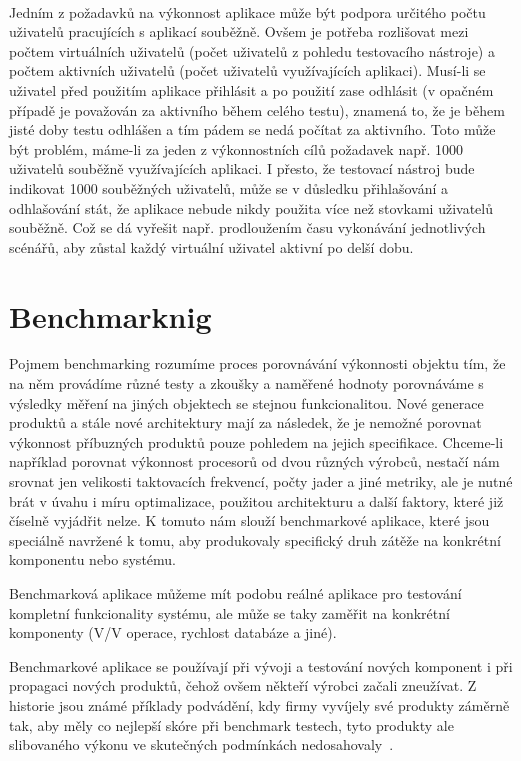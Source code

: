 \documentclass[122pt,oneside]{fithesis}
\begin{document}
\vspace{5 mm}
\\\indent Jedním z požadavků na výkonnost aplikace může být podpora určitého počtu uživatelů pracujících s aplikací souběžně. Ovšem je potřeba rozlišovat mezi počtem virtuálních uživatelů (počet uživatelů z pohledu testovacího nástroje) a počtem aktivních uživatelů (počet uživatelů využívajících aplikaci). Musí-li se uživatel před použitím aplikace přihlásit a po použití zase odhlásit (v opačném případě je považován za aktivního během celého testu), znamená to, že je během jisté doby testu odhlášen a tím pádem se nedá počítat za aktivního. Toto může být problém, máme-li za jeden z výkonnostních cílů požadavek např. 1000 uživatelů souběžně využívajících aplikaci. I přesto, že testovací nástroj bude indikovat 1000 souběžných uživatelů, může se v důsledku přihlašování a odhlašování stát, že aplikace nebude nikdy použita více než stovkami uživatelů souběžně. Což se dá vyřešit např. prodloužením času vykonávání jednotlivých scénářů, aby zůstal každý virtuální uživatel aktivní po delší dobu.

\chapter{Benchmarknig}

Pojmem benchmarking rozumíme proces porovnávání výkonnosti objektu tím, že na něm provádíme různé testy a zkoušky a naměřené hodnoty porovnáváme s výsledky měření na jiných objektech se stejnou funkcionalitou. Nové generace produktů a stále nové architektury mají za následek, že je nemožné porovnat výkonnost příbuzných produktů pouze pohledem na jejich specifikace. Chceme-li například porovnat výkonnost procesorů od dvou různých výrobců, nestačí nám srovnat jen velikosti taktovacích frekvencí, počty jader a jiné metriky, ale je nutné brát v úvahu i míru optimalizace, použitou architekturu a další faktory, které již číselně vyjádřit nelze. K tomuto nám slouží benchmarkové aplikace, které jsou speciálně navržené k tomu, aby produkovaly specifický druh zátěže na konkrétní komponentu nebo systému.

Benchmarková aplikace můžeme mít podobu reálné aplikace pro testování kompletní funkcionality systému, ale může se taky zaměřit na konkrétní komponenty (V/V operace, rychlost databáze a jiné).

Benchmarkové aplikace se používají při vývoji a testování nových komponent i při propagaci nových produktů, čehož ovšem někteří výrobci začali zneužívat. Z historie jsou známé příklady podvádění, kdy firmy vyvíjely své produkty záměrně tak, aby měly co nejlepší skóre při benchmark testech, tyto produkty ale slibovaného výkonu ve skutečných podmínkách nedosahovaly~\cite{wikiBench}.
\end{document}
